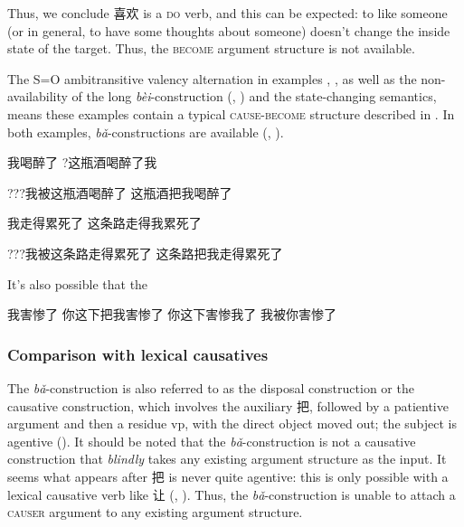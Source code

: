 \documentclass[UTF8, a4paper, oneside, scheme=plain]{ctexrep}
\newcommand{\corpus}[1]{\emph{#1}}
\newcommand*{\category}[1]{\textsc{#1}}
\begin{document}
Thus, we conclude 喜欢 is a \category{do} verb, 
and this can be expected: 
to like someone (or in general, to have some thoughts about someone) 
doesn't change the inside state of the target.
Thus, the \category{become} argument structure is not available. 

The S=O ambitransitive valency alternation 
in examples , ,
as well as the non-availability of the long \corpus{bèi}-construction
(, )
and the state-changing semantics,
means these examples contain a typical \category{cause}-\category{become} structure 
described in .
In both examples, 
\corpus{bǎ}-constructions are available 
(, ).

\begin{exe}
    \ex\label{ex:verb-phrase.ba.cause.1} \begin{xlist}
        \ex 我喝醉了
        \ex ?这瓶酒喝醉了我
    \end{xlist}
    \ex\label{ex:verb-phrase.ba.bei-1} ???我被这瓶酒喝醉了
    \ex\label{ex:verb-phrase.ba.ba-1} 这瓶酒把我喝醉了
\end{exe}

\begin{exe}
    \ex\label{ex:verb-phrase.ba.cause.2} \begin{xlist}
        \ex 我走得累死了
        \ex 这条路走得我累死了
    \end{xlist}
    \ex\label{ex:verb-phrase.ba.bei-2} ???我被这条路走得累死了
    \ex\label{ex:verb-phrase.ba.ba-2} 这条路把我走得累死了
\end{exe}

It's also possible that the 

\begin{exe}
    \ex *我害惨了
    \ex 你这下把我害惨了
    \ex 你这下害惨我了
    \ex 我被你害惨了
\end{exe}

\subsubsection{Comparison with lexical causatives}

The \corpus{bǎ}-construction is also referred to as 
the disposal construction or the causative construction,
which involves the auxiliary 把, followed by a patientive argument 
and then a residue \acs{vp},
with the direct object moved out;
the subject is agentive ().
It should be noted that the \corpus{bǎ}-construction is not
a causative construction that \emph{blindly} takes any existing argument structure as the input.
It seems what appears after 把 is never quite agentive:
this is only possible with a lexical causative verb like 让
(, ).
Thus, the \corpus{bǎ}-construction is unable to attach a \category{causer} argument 
to any existing argument structure. 
\end{document}
